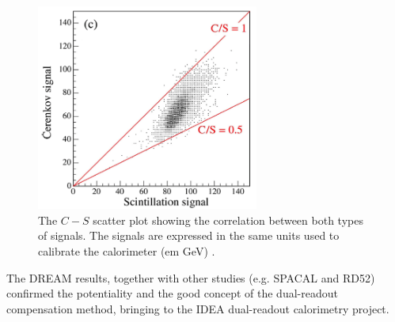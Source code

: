 \begin{figure}
	\centering
	\includegraphics[width=0.65\textwidth]{IMG/Cap2/theta_DREAM.png}
	\caption{ The $C-S$ scatter plot showing the correlation between both types of signals. The signals are expressed in the same units used to calibrate the calorimeter (em GeV) \cite{DREAM2}.}
	\label{fig:theta_DREAM}
\end{figure}

The DREAM results, together with other studies (e.g. SPACAL and RD52) confirmed the potentiality and the good concept of the dual-readout compensation method, bringing to the IDEA dual-readout calorimetry project.
